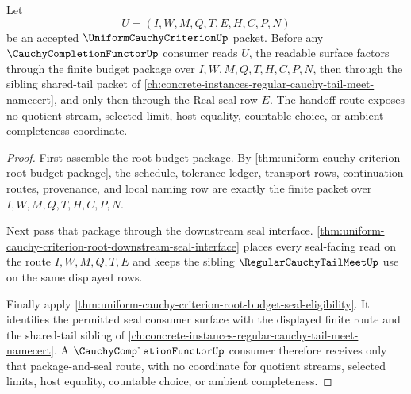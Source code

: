 \begin{theorem}
\label{thm:uniform-cauchy-criterion-completion-functor-budget-handoff}
Let
$$
U=(I,W,M,Q,T,E,H,C,P,N)
$$
be an accepted $\UniformCauchyCriterionUp$ packet. Before any $\CauchyCompletionFunctorUp$ consumer reads $U$, the readable surface factors through the finite budget package over $I,W,M,Q,T,H,C,P,N$, then through the sibling shared-tail packet of \autoref{ch:concrete-instances-regular-cauchy-tail-meet-namecert}, and only then through the Real seal row $E$. The handoff route exposes no quotient stream, selected limit, host equality, countable choice, or ambient completeness coordinate.
\end{theorem}
\begin{proof}
First assemble the root budget package. By \autoref{thm:uniform-cauchy-criterion-root-budget-package}, the schedule, tolerance ledger, transport rows, continuation routes, provenance, and local naming row are exactly the finite packet over $I,W,M,Q,T,H,C,P,N$.

Next pass that package through the downstream seal interface. \autoref{thm:uniform-cauchy-criterion-root-downstream-seal-interface} places every seal-facing read on the route $I,W,M,Q,T,E$ and keeps the sibling $\RegularCauchyTailMeetUp$ use on the same displayed rows.

Finally apply \autoref{thm:uniform-cauchy-criterion-root-budget-seal-eligibility}. It identifies the permitted seal consumer surface with the displayed finite route and the shared-tail sibling of \autoref{ch:concrete-instances-regular-cauchy-tail-meet-namecert}. A $\CauchyCompletionFunctorUp$ consumer therefore receives only that package-and-seal route, with no coordinate for quotient streams, selected limits, host equality, countable choice, or ambient completeness.
\end{proof}

